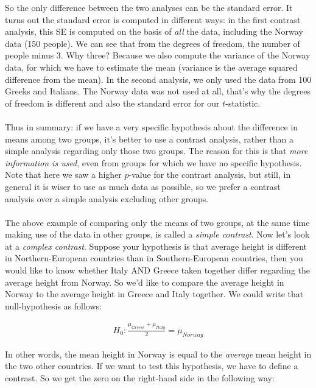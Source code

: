 So the only difference between the two analyses can be the standard error. It turns out the standard error is computed in different ways: in the first contrast analysis, this SE is computed on the basis of \textit{all} the data, including the Norway data (150 people). We can see that from the degrees of freedom, the number of people minus 3. Why three? Because we also compute the variance of the Norway data, for which we have to estimate the mean (variance is the average squared difference from the mean). In the second analysis, we only used the data from 100 Greeks and Italians. The Norway data was not used at all, that's why the degrees of freedom is different and also the standard error for our $t$-statistic. 
\\
\\
Thus in summary: if we have a very specific hypothesis about the difference in means among two groups, it's better to use a contrast analysis, rather than a simple analysis regarding only those two groups. The reason for this is that \textit{more information is used}, even from groups for which we have no specific hypothesis. 
\\
Note that here we saw a higher $p$-value for the contrast analysis, but still, in general it is wiser to use as much data as possible, so we prefer a contrast analysis over a simple analysis excluding other groups.
\\
\\
The above example of comparing only the means of two groups, at the same time making use of the data in other groups, is called a \textit{simple contrast}. Now let's look at a \textit{complex contrast}. Suppose your hypothesis is that average height is different in Northern-European countries than in Southern-European countries, then you would like to know whether Italy AND Greece taken together differ regarding the average height from Norway. So we'd like to compare the average height in Norway to the average height in Greece and Italy together. We could write that null-hypothesis as follows:

\begin{eqnarray}
H_0 : \frac{\mu_{Greece}+ \mu_{Italy}}{2} = \mu_{Norway}
\end{eqnarray}


In other words, the mean height in Norway is equal to the \textit{average} mean height in the two other countries. If we want to test this hypothesis, we have to define a contrast. So we get the zero on the right-hand side in the following way:

